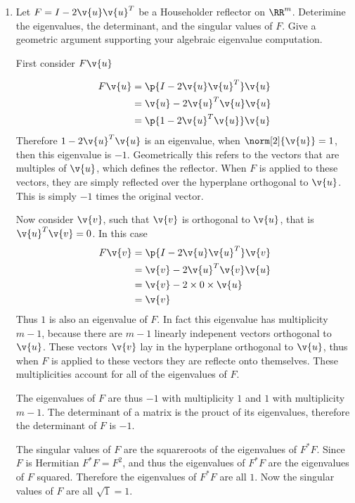 \documentclass[11pt]{article}
\begin{document}
\begin{enumerate}
    \item %
        Let $F = I - 2\v{u}\v{u}^T$ be a Householder reflector on $\RR^m$.
        Deterimine the eigenvalues, the determinant, and the singular values of
        $F$.
        Give a geometric argument supporting your algebraic eigenvalue
        computation.

        First consider $F\v{u}$

        \begin{align*}
            F\v{u} &= \p{I - 2\v{u}\v{u}^T} \v{u} \\
                   &= \v{u} - 2\v{u}^T\v{u} \v{u} \\
                   &= \p{1 - 2\v{u}^T\v{u}} \v{u}
        \end{align*}
        Therefore $1 - 2\v{u}^T\v{u}$ is an eigenvalue, when
        $\norm[2]{\v{u}} = 1$, then this eigenvalue is $-1$.
        Geometrically this refers to the vectors that are multiples of $\v{u}$,
        which defines the reflector.
        When $F$ is applied to these vectors, they are simply reflected over the
        hyperplane orthogonal to $\v{u}$.
        This is simply $-1$ times the original vector.

        Now consider $\v{v}$, such that $\v{v}$ is orthogonal to $\v{u}$,
        that is $\v{u}^T\v{v} = 0$.
        In this case
        \begin{align*}
            F\v{v} &= \p{I - 2\v{u}\v{u}^T}\v{v} \\
            &= \v{v} - 2 \v{u}^T \v{v} \v{u} \\
            &= \v{v} - 2 \times 0 \times \v{u} \\
            &= \v{v}
        \end{align*}
        Thus $1$ is also an eigenvalue of $F$.
        In fact this eigenvalue has multiplicity $m - 1$, because there are
        $m - 1$ linearly indepenent vectors orthogonal to $\v{u}$.
        These vectors $\v{v}$ lay in the hyperplane orthogonal to $\v{u}$, thus
        when $F$ is applied to these vectors they are reflecte onto themselves.
        These multiplicities account for all of the eigenvalues of $F$.

        The eigenvalues of $F$ are thus $-1$ with multiplicity $1$ and $1$ with
        multiplicity $m - 1$.
        The determinant of a matrix is the prouct of its eigenvalues, therefore
        the determinant of $F$ is $-1$.

        The singular values of $F$ are the squareroots of the eigenvalues of
        $F^* F$.
        Since $F$ is Hermitian $F^* F = F^2$, and thus the eigenvalues of
        $F^* F$ are the eigenvalues of $F$ squared.
        Therefore the eigenvalues of $F^* F$ are all $1$.
        Now the singular values of $F$ are all $\sqrt{1} = 1$.


\end{enumerate}
\end{document}

